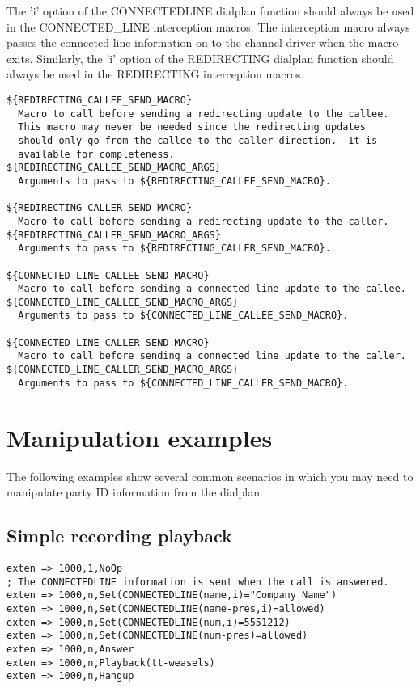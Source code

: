 The 'i' option of the CONNECTEDLINE dialplan function should always be
used in the CONNECTED_LINE interception macros.  The interception macro
always passes the connected line information on to the channel driver when
the macro exits.  Similarly, the 'i' option of the REDIRECTING dialplan
function should always be used in the REDIRECTING interception macros.

\begin{verbatim}
${REDIRECTING_CALLEE_SEND_MACRO}
  Macro to call before sending a redirecting update to the callee.
  This macro may never be needed since the redirecting updates
  should only go from the callee to the caller direction.  It is
  available for completeness.
${REDIRECTING_CALLEE_SEND_MACRO_ARGS}
  Arguments to pass to ${REDIRECTING_CALLEE_SEND_MACRO}.

${REDIRECTING_CALLER_SEND_MACRO}
  Macro to call before sending a redirecting update to the caller.
${REDIRECTING_CALLER_SEND_MACRO_ARGS}
  Arguments to pass to ${REDIRECTING_CALLER_SEND_MACRO}.

${CONNECTED_LINE_CALLEE_SEND_MACRO}
  Macro to call before sending a connected line update to the callee.
${CONNECTED_LINE_CALLEE_SEND_MACRO_ARGS}
  Arguments to pass to ${CONNECTED_LINE_CALLEE_SEND_MACRO}.

${CONNECTED_LINE_CALLER_SEND_MACRO}
  Macro to call before sending a connected line update to the caller.
${CONNECTED_LINE_CALLER_SEND_MACRO_ARGS}
  Arguments to pass to ${CONNECTED_LINE_CALLER_SEND_MACRO}.
\end{verbatim}

\section{Manipulation examples}

The following examples show several common scenarios in which you may need
to manipulate party ID information from the dialplan.

\subsection{Simple recording playback}

\begin{verbatim}
exten => 1000,1,NoOp
; The CONNECTEDLINE information is sent when the call is answered.
exten => 1000,n,Set(CONNECTEDLINE(name,i)="Company Name")
exten => 1000,n,Set(CONNECTEDLINE(name-pres,i)=allowed)
exten => 1000,n,Set(CONNECTEDLINE(num,i)=5551212)
exten => 1000,n,Set(CONNECTEDLINE(num-pres)=allowed)
exten => 1000,n,Answer
exten => 1000,n,Playback(tt-weasels)
exten => 1000,n,Hangup
\end{verbatim}

